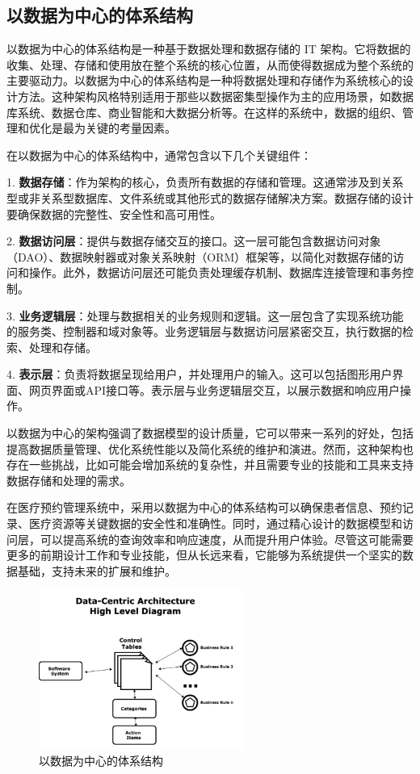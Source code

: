 \subsection{以数据为中心的体系结构}

以数据为中心的体系结构是一种基于数据处理和数据存储的 IT 架构。它将数据的收集、处理、存储和使用放在整个系统的核心位置，从而使得数据成为整个系统的主要驱动力。以数据为中心的体系结构是一种将数据处理和存储作为系统核心的设计方法。这种架构风格特别适用于那些以数据密集型操作为主的应用场景，如数据库系统、数据仓库、商业智能和大数据分析等。在这样的系统中，数据的组织、管理和优化是最为关键的考量因素。

在以数据为中心的体系结构中，通常包含以下几个关键组件：

1. \textbf{数据存储}：作为架构的核心，负责所有数据的存储和管理。这通常涉及到关系型或非关系型数据库、文件系统或其他形式的数据存储解决方案。数据存储的设计要确保数据的完整性、安全性和高可用性。

2. \textbf{数据访问层}：提供与数据存储交互的接口。这一层可能包含数据访问对象（DAO）、数据映射器或对象关系映射（ORM）框架等，以简化对数据存储的访问和操作。此外，数据访问层还可能负责处理缓存机制、数据库连接管理和事务控制。

3. \textbf{业务逻辑层}：处理与数据相关的业务规则和逻辑。这一层包含了实现系统功能的服务类、控制器和域对象等。业务逻辑层与数据访问层紧密交互，执行数据的检索、处理和存储。

4. \textbf{表示层}：负责将数据呈现给用户，并处理用户的输入。这可以包括图形用户界面、网页界面或API接口等。表示层与业务逻辑层交互，以展示数据和响应用户操作。

以数据为中心的架构强调了数据模型的设计质量，它可以带来一系列的好处，包括提高数据质量管理、优化系统性能以及简化系统的维护和演进。然而，这种架构也存在一些挑战，比如可能会增加系统的复杂性，并且需要专业的技能和工具来支持数据存储和处理的需求。

在医疗预约管理系统中，采用以数据为中心的体系结构可以确保患者信息、预约记录、医疗资源等关键数据的安全性和准确性。同时，通过精心设计的数据模型和访问层，可以提高系统的查询效率和响应速度，从而提升用户体验。尽管这可能需要更多的前期设计工作和专业技能，但从长远来看，它能够为系统提供一个坚实的数据基础，支持未来的扩展和维护。

\begin{figure}[htbp]
	\centering
	\includegraphics[width=0.6\textwidth]{figures/09.png}
	\caption{以数据为中心的体系结构}
\end{figure}

